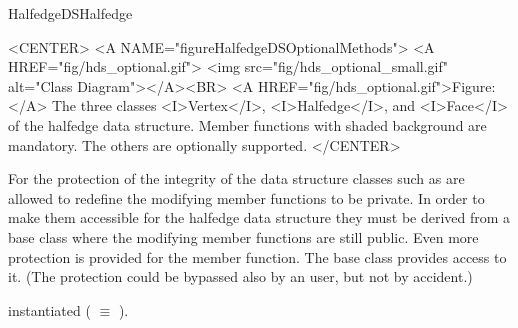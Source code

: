 \begin{ccRefConcept}{HalfedgeDSHalfedge}
\begin{ccHtmlOnly}
    <CENTER>
    <A NAME="figureHalfedgeDSOptionalMethods">
    <A HREF="fig/hds_optional.gif">
        <img src="fig/hds_optional_small.gif" 
             alt="Class Diagram"></A><BR>
    <A HREF="fig/hds_optional.gif">Figure:</A>
    The three classes <I>Vertex</I>, <I>Halfedge</I>, and 
          <I>Face</I> of the halfedge data structure. Member
          functions with shaded background are mandatory. The others
          are optionally supported.
    </CENTER>
\end{ccHtmlOnly}

For the protection of the integrity of the data structure classes such
as  are allowed to redefine the modifying member
functions to be private. In order to make them accessible for the
halfedge data structure they must be derived from a base class
 where the modifying member functions are still public. Even
more protection is provided for the  member
function. The base class  provides access to it.  (The
protection could be bypassed also by an user, but not by accident.)

\ccTypes

\ccThreeToTwo

    {instantiated  ( $\equiv$ ).}
\ccGlue
{}
\ccGlue
{}
\ccGlue
{}
\ccGlue
{}

\ccGlue
{}
\ccGlue
{}
\ccGlue
{}
\ccGlue
{}
\ccGlue
{}

\ccGlue
{}
\ccGlue
{}

\ccCreation
{}


\ccOperations
\ccTagFullDeclarations


\end{ccRefConcept}
